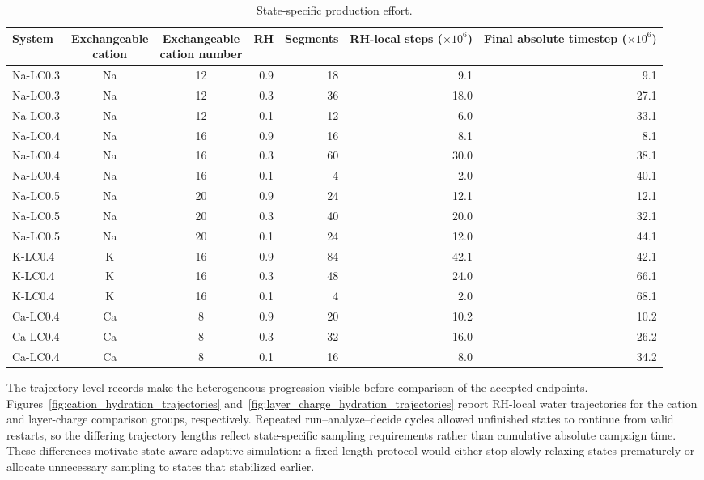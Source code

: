 \begin{table}[t]
  \centering
  \caption{State-specific production effort.}
  \label{tab:production_summary}
  \scriptsize
  \setlength{\tabcolsep}{2.8pt}
  \begin{tabular}{lccrrrr}
    \hline
    System & \shortstack{Exchangeable\\cation} & \shortstack{Exchangeable\\cation number} & RH & Segments & \shortstack{RH-local steps\\($\times10^{6}$)} & \shortstack{Final absolute timestep\\($\times10^{6}$)} \\
    \hline
    Na-LC0.3 & Na & 12 & 0.9 & 18 & 9.1 & 9.1 \\
    Na-LC0.3 & Na & 12 & 0.3 & 36 & 18.0 & 27.1 \\
    Na-LC0.3 & Na & 12 & 0.1 & 12 & 6.0 & 33.1 \\
    Na-LC0.4 & Na & 16 & 0.9 & 16 & 8.1 & 8.1 \\
    Na-LC0.4 & Na & 16 & 0.3 & 60 & 30.0 & 38.1 \\
    Na-LC0.4 & Na & 16 & 0.1 & 4  & 2.0 & 40.1 \\
    Na-LC0.5 & Na & 20 & 0.9 & 24 & 12.1 & 12.1 \\
    Na-LC0.5 & Na & 20 & 0.3 & 40 & 20.0 & 32.1 \\
    Na-LC0.5 & Na & 20 & 0.1 & 24 & 12.0 & 44.1 \\
    K-LC0.4  & K  & 16 & 0.9 & 84 & 42.1 & 42.1 \\
    K-LC0.4  & K  & 16 & 0.3 & 48 & 24.0 & 66.1 \\
    K-LC0.4  & K  & 16 & 0.1 & 4  & 2.0 & 68.1 \\
    Ca-LC0.4 & Ca & 8  & 0.9 & 20 & 10.2 & 10.2 \\
    Ca-LC0.4 & Ca & 8  & 0.3 & 32 & 16.0 & 26.2 \\
    Ca-LC0.4 & Ca & 8  & 0.1 & 16 & 8.0 & 34.2 \\
    \hline
  \end{tabular}
\end{table}

The trajectory-level records make the heterogeneous progression visible before comparison of the accepted endpoints. Figures~\ref{fig:cation_hydration_trajectories} and~\ref{fig:layer_charge_hydration_trajectories} report RH-local water trajectories for the cation and layer-charge comparison groups, respectively. Repeated run--analyze--decide cycles allowed unfinished states to continue from valid restarts, so the differing trajectory lengths reflect state-specific sampling requirements rather than cumulative absolute campaign time. These differences motivate state-aware adaptive simulation: a fixed-length protocol would either stop slowly relaxing states prematurely or allocate unnecessary sampling to states that stabilized earlier.

